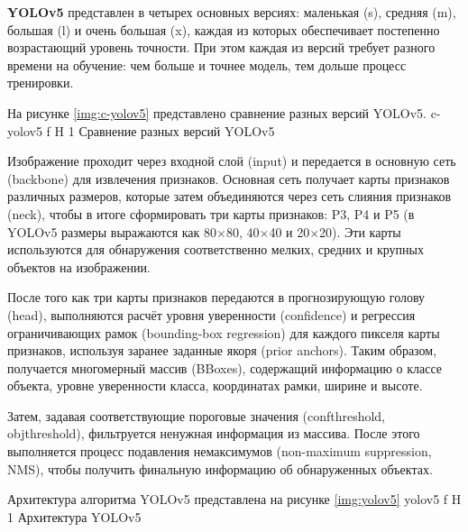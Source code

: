 \textbf{YOLOv5} представлен в четырех основных версиях: маленькая (s), средняя (m), большая (l) и очень большая (x), каждая из которых обеспечивает постепенно возрастающий уровень точности. При этом каждая из версий требует разного времени на обучение: чем больше и точнее модель, тем дольше процесс тренировки.

На рисунке \ref{img:c-yolov5} представлено сравнение разных версий YOLOv5.
	{c-yolov5}
	{f}
	{H}
	{1\textwidth}
	{Сравнение разных версий YOLOv5}

Изображение проходит через входной слой (input) и передается в основную сеть (backbone) для извлечения признаков.
Основная сеть получает карты признаков различных размеров, которые затем объединяются через сеть слияния признаков (neck), чтобы в итоге сформировать три карты признаков: P3, P4 и P5 (в YOLOv5 размеры выражаются как 80×80, 40×40 и 20×20). Эти карты используются для обнаружения соответственно мелких, средних и крупных объектов на изображении.

После того как три карты признаков передаются в прогнозирующую голову (head), выполняются расчёт уровня уверенности (confidence) и регрессия ограничивающих рамок (bounding-box regression) для каждого пикселя карты признаков, используя заранее заданные якоря (prior anchors). Таким образом, получается многомерный массив (BBoxes), содержащий информацию о классе объекта, уровне уверенности класса, координатах рамки, ширине и высоте.

Затем, задавая соответствующие пороговые значения (confthreshold, objthreshold), фильтруется ненужная информация из массива. После этого выполняется процесс подавления немаксимумов (non-maximum suppression, NMS), чтобы получить финальную информацию об обнаруженных объектах.

Архитектура алгоритма YOLOv5 представлена на рисунке \ref{img:yolov5}
	{yolov5}
	{f}
	{H}
	{1\textwidth}
	{Архитектура YOLOv5}

